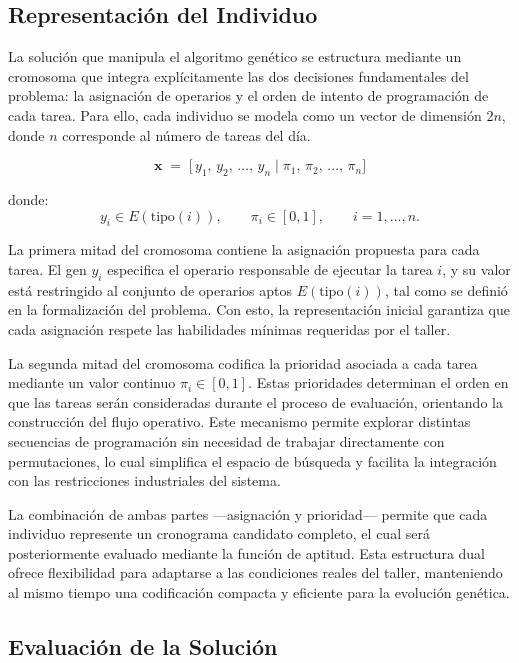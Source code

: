 \subsection{Representación del Individuo}

La solución que manipula el algoritmo genético se estructura mediante un cromosoma 
que integra explícitamente las dos decisiones fundamentales del problema: la asignación 
de operarios y el orden de intento de programación de cada tarea. Para ello, cada 
individuo se modela como un vector de dimensión $2n$, donde $n$ corresponde al número 
de tareas del día.

\[
\mathbf{x} \;=\;
\big[\, y_1,\, y_2,\, \dots,\, y_n 
\;\big|\; 
\pi_1,\, \pi_2,\, \dots,\, \pi_n \big]
\]

donde:
\[
y_i \in E(\mathrm{tipo}(i)), 
\qquad 
\pi_i \in [0,1], 
\qquad i = 1,\dots,n.
\]

La primera mitad del cromosoma contiene la asignación propuesta para cada tarea. 
El gen $y_i$ especifica el operario responsable de ejecutar la tarea $i$, y su valor está 
restringido al conjunto de operarios aptos $E(\mathrm{tipo}(i))$, tal como se definió en la 
formalización del problema. Con esto, la representación inicial garantiza que cada 
asignación respete las habilidades mínimas requeridas por el taller.

La segunda mitad del cromosoma codifica la prioridad asociada a cada tarea mediante 
un valor continuo $\pi_i \in [0,1]$. Estas prioridades determinan el orden en que las tareas 
serán consideradas durante el proceso de evaluación, orientando la construcción del flujo 
operativo. Este mecanismo permite explorar distintas secuencias de programación sin 
necesidad de trabajar directamente con permutaciones, lo cual simplifica el espacio de 
búsqueda y facilita la integración con las restricciones industriales del sistema.

La combinación de ambas partes ---asignación y prioridad--- permite que cada individuo 
represente un cronograma candidato completo, el cual será posteriormente evaluado 
mediante la función de aptitud. Esta estructura dual ofrece flexibilidad para adaptarse a 
las condiciones reales del taller, manteniendo al mismo tiempo una codificación compacta 
y eficiente para la evolución genética.


\subsection{Evaluación de la Solución}

